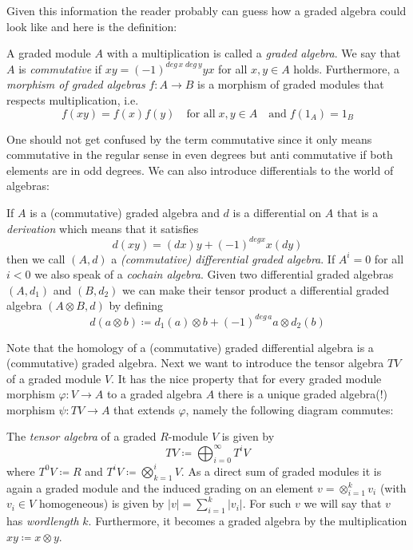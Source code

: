  Given this information the reader probably can guess how a graded algebra could look like and here is the definition:
\begin{Definition}
 A graded module $A$ with a multiplication is called a \emph{graded algebra}. We say that $A$ is \emph{commutative} if
 $xy = (-1)^{deg \, x \; deg \, y} yx$ for all $x,y \in A$ holds. Furthermore, a \emph{morphism of graded algebras} 
 $f \colon A \to B$ is a morphism of graded modules that respects multiplication, i.e.\ 
 $$f(xy) = f(x)f(y) \quad \text{for all} \; x,y \in A \quad \text{and} \; f(1_A) = 1_B $$
\end{Definition}

One should not get confused by the term commutative since it only means commutative in the regular sense in even degrees but
anti commutative if both elements are in odd degrees.
We can also introduce differentials to the world of algebras:
\begin{Definition}
 If $A$ is a (commutative) graded algebra and $d$ is a differential on $A$ that is a \emph{derivation} which means
 that it satisfies 
 $$ d(xy) = (dx)y + (-1)^{deg x} x(dy)$$
 then we call $(A,d)$ a \emph{(commutative) differential graded algebra}. If $A^i = 0$ for all $i < 0$ we also
 speak of a \emph{cochain algebra}. \newline
 Given two differential graded algebras $(A,d_1)$ and $(B, d_2)$ we can make their tensor product a 
 differential graded algebra $(A \otimes B, d)$ by defining 
 $$ d(a \otimes b) \coloneqq d_1(a) \otimes b + (-1)^{deg \, a} a \otimes d_2(b)$$
\end{Definition}

Note that the homology of a (commutative) graded differential algebra is a (commutative) graded algebra. \newline
Next we want to introduce the tensor algebra $TV$ of a graded module $V$. It has the nice property
that for every graded module morphism $\varphi \colon V \to A$ to a graded algebra $A$ there is a unique 
graded algebra(!) morphism $\psi \colon TV \to A$ that extends $\varphi$, namely the following diagram commutes:

\centerline{ 
}

\begin{Definition}
 The \emph{tensor algebra} of a graded $R$-module $V$ is given by
 $$ TV \coloneqq \bigoplus_{i = 0}^\infty T^i V$$
 where $T^0 V \coloneqq R$ and $T^i V \coloneqq \bigotimes_{k=1}^i V$. \newline
 As a direct sum of graded modules it is again a graded module and the induced grading on an element
 $ v = \otimes_{i = 1}^k v_i $ (with $v_i \in V$ homogeneous) is given by $ |v| = \sum_{ i = 1}^k |v_i|$.
 For such $v$ we will say that $v$ has \emph{wordlength} $k$.
 Furthermore, it becomes a graded algebra by the multiplication $xy \coloneqq x \otimes y$.
\end{Definition}

